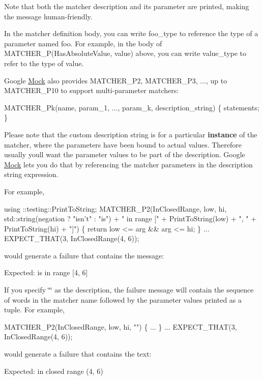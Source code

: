 Note that both the matcher description and its parameter are printed, making the message human-\/friendly.

In the matcher definition body, you can write {\ttfamily foo\+\_\+type} to reference the type of a parameter named {\ttfamily foo}. For example, in the body of {\ttfamily M\+A\+T\+C\+H\+E\+R\+\_\+\+P(\+Has\+Absolute\+Value, value)} above, you can write {\ttfamily value\+\_\+type} to refer to the type of {\ttfamily value}.

Google \hyperlink{classMock}{Mock} also provides {\ttfamily M\+A\+T\+C\+H\+E\+R\+\_\+\+P2}, {\ttfamily M\+A\+T\+C\+H\+E\+R\+\_\+\+P3}, ..., up to {\ttfamily M\+A\+T\+C\+H\+E\+R\+\_\+\+P10} to support multi-\/parameter matchers\+: 
\begin{DoxyCode}
MATCHER\_Pk(name, param\_1, ..., param\_k, description\_string) \{ statements; \}
\end{DoxyCode}


Please note that the custom description string is for a particular {\bfseries instance} of the matcher, where the parameters have been bound to actual values. Therefore usually you\textquotesingle{}ll want the parameter values to be part of the description. Google \hyperlink{classMock}{Mock} lets you do that by referencing the matcher parameters in the description string expression.

For example, 
\begin{DoxyCode}
using ::testing::PrintToString;
MATCHER\_P2(InClosedRange, low, hi,
           std::string(negation ? \textcolor{stringliteral}{"isn't"} : \textcolor{stringliteral}{"is"}) + \textcolor{stringliteral}{" in range ["} +
           PrintToString(low) + \textcolor{stringliteral}{", "} + PrintToString(hi) + \textcolor{stringliteral}{"]"}) \{
  \textcolor{keywordflow}{return} low <= arg && arg <= hi;
\}
...
EXPECT\_THAT(3, InClosedRange(4, 6));
\end{DoxyCode}
 would generate a failure that contains the message\+: 
\begin{DoxyCode}
Expected: is in range [4, 6]
\end{DoxyCode}


If you specify {\ttfamily \char`\"{}\char`\"{}} as the description, the failure message will contain the sequence of words in the matcher name followed by the parameter values printed as a tuple. For example, 
\begin{DoxyCode}
MATCHER\_P2(InClosedRange, low, hi, \textcolor{stringliteral}{""}) \{ ... \}
...
EXPECT\_THAT(3, InClosedRange(4, 6));
\end{DoxyCode}
 would generate a failure that contains the text\+: 
\begin{DoxyCode}
Expected: in closed range (4, 6)
\end{DoxyCode}


